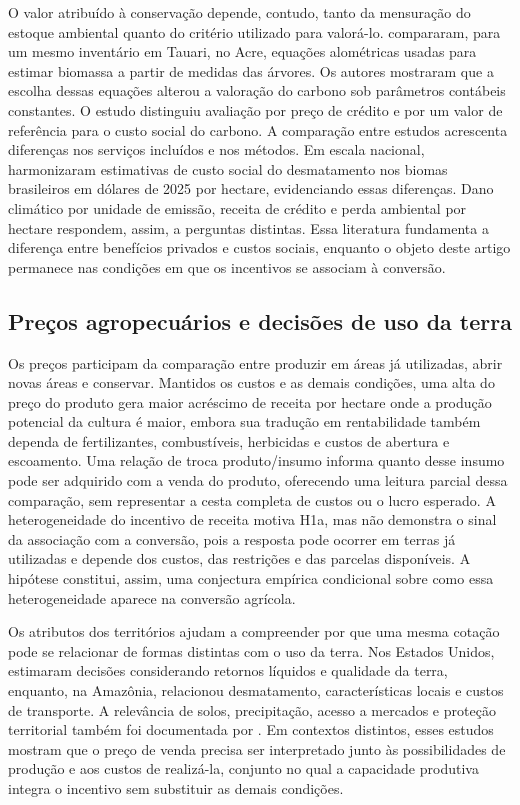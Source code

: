 O valor atribuído à conservação depende, contudo, tanto da mensuração do estoque ambiental quanto do critério utilizado para valorá-lo.  compararam, para um mesmo inventário em Tauari, no Acre, equações alométricas usadas para estimar biomassa a partir de medidas das árvores. Os autores mostraram que a escolha dessas equações alterou a valoração do carbono sob parâmetros contábeis constantes. O estudo distinguiu avaliação por preço de crédito e por um valor de referência para o custo social do carbono. A comparação entre estudos acrescenta diferenças nos serviços incluídos e nos métodos. Em escala nacional,  harmonizaram estimativas de custo social do desmatamento nos biomas brasileiros em dólares de 2025 por hectare, evidenciando essas diferenças. Dano climático por unidade de emissão, receita de crédito e perda ambiental por hectare respondem, assim, a perguntas distintas. Essa literatura fundamenta a diferença entre benefícios privados e custos sociais, enquanto o objeto deste artigo permanece nas condições em que os incentivos se associam à conversão.

\subsection{Preços agropecuários e decisões de uso da terra}
\label{literatura-precos}

Os preços participam da comparação entre produzir em áreas já utilizadas, abrir novas áreas e conservar. Mantidos os custos e as demais condições, uma alta do preço do produto gera maior acréscimo de receita por hectare onde a produção potencial da cultura é maior, embora sua tradução em rentabilidade também dependa de fertilizantes, combustíveis, herbicidas e custos de abertura e escoamento. Uma relação de troca produto/insumo informa quanto desse insumo pode ser adquirido com a venda do produto, oferecendo uma leitura parcial dessa comparação, sem representar a cesta completa de custos ou o lucro esperado. A heterogeneidade do incentivo de receita motiva H1a, mas não demonstra o sinal da associação com a conversão, pois a resposta pode ocorrer em terras já utilizadas e depende dos custos, das restrições e das parcelas disponíveis. A hipótese constitui, assim, uma conjectura empírica condicional sobre como essa heterogeneidade aparece na conversão agrícola.

Os atributos dos territórios ajudam a compreender por que uma mesma cotação pode se relacionar de formas distintas com o uso da terra. Nos Estados Unidos,  estimaram decisões considerando retornos líquidos e qualidade da terra, enquanto, na Amazônia,  relacionou desmatamento, características locais e custos de transporte. A relevância de solos, precipitação, acesso a mercados e proteção territorial também foi documentada por . Em contextos distintos, esses estudos mostram que o preço de venda precisa ser interpretado junto às possibilidades de produção e aos custos de realizá-la, conjunto no qual a capacidade produtiva integra o incentivo sem substituir as demais condições.

